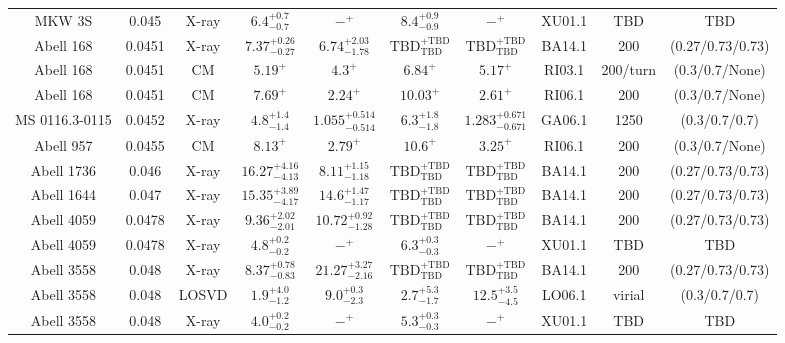 \begin{table}
\begin{tabular}{cccccccccc}
MKW 3S & 0.045 & X-ray & ${6.4}^{+0.7}_{-0.7}$ & ${-}^{+}_{}$ & ${8.4}^{+0.9}_{-0.9}$ & ${-}^{+}_{}$ & XU01.1 & TBD & TBD \\
Abell 168 & 0.0451 & X-ray & ${7.37}^{+0.26}_{-0.27}$ & ${6.74}^{+2.03}_{-1.78}$ & ${\mathrm{TBD}}^{+\mathrm{TBD}}_{\mathrm{TBD}}$ & ${\mathrm{TBD}}^{+\mathrm{TBD}}_{\mathrm{TBD}}$ & BA14.1 & 200 & (0.27/0.73/0.73) \\
Abell 168 & 0.0451 & CM & ${5.19}^{+}_{}$ & ${4.3}^{+}_{}$ & ${6.84}^{+}_{}$ & ${5.17}^{+}_{}$ & RI03.1 & 200/turn & (0.3/0.7/None) \\
Abell 168 & 0.0451 & CM & ${7.69}^{+}_{}$ & ${2.24}^{+}_{}$ & ${10.03}^{+}_{}$ & ${2.61}^{+}_{}$ & RI06.1 & 200 & (0.3/0.7/None) \\
MS 0116.3-0115 & 0.0452 & X-ray & ${4.8}^{+1.4}_{-1.4}$ & ${1.055}^{+0.514}_{-0.514}$ & ${6.3}^{+1.8}_{-1.8}$ & ${1.283}^{+0.671}_{-0.671}$ & GA06.1 & 1250 & (0.3/0.7/0.7) \\
Abell 957 & 0.0455 & CM & ${8.13}^{+}_{}$ & ${2.79}^{+}_{}$ & ${10.6}^{+}_{}$ & ${3.25}^{+}_{}$ & RI06.1 & 200 & (0.3/0.7/None) \\
Abell 1736 & 0.046 & X-ray & ${16.27}^{+4.16}_{-4.13}$ & ${8.11}^{+1.15}_{-1.18}$ & ${\mathrm{TBD}}^{+\mathrm{TBD}}_{\mathrm{TBD}}$ & ${\mathrm{TBD}}^{+\mathrm{TBD}}_{\mathrm{TBD}}$ & BA14.1 & 200 & (0.27/0.73/0.73) \\
Abell 1644 & 0.047 & X-ray & ${15.35}^{+3.89}_{-4.17}$ & ${14.6}^{+1.47}_{-1.17}$ & ${\mathrm{TBD}}^{+\mathrm{TBD}}_{\mathrm{TBD}}$ & ${\mathrm{TBD}}^{+\mathrm{TBD}}_{\mathrm{TBD}}$ & BA14.1 & 200 & (0.27/0.73/0.73) \\
Abell 4059 & 0.0478 & X-ray & ${9.36}^{+2.02}_{-2.01}$ & ${10.72}^{+0.92}_{-1.28}$ & ${\mathrm{TBD}}^{+\mathrm{TBD}}_{\mathrm{TBD}}$ & ${\mathrm{TBD}}^{+\mathrm{TBD}}_{\mathrm{TBD}}$ & BA14.1 & 200 & (0.27/0.73/0.73) \\
Abell 4059 & 0.0478 & X-ray & ${4.8}^{+0.2}_{-0.2}$ & ${-}^{+}_{}$ & ${6.3}^{+0.3}_{-0.3}$ & ${-}^{+}_{}$ & XU01.1 & TBD & TBD \\
Abell 3558 & 0.048 & X-ray & ${8.37}^{+0.78}_{-0.83}$ & ${21.27}^{+3.27}_{-2.16}$ & ${\mathrm{TBD}}^{+\mathrm{TBD}}_{\mathrm{TBD}}$ & ${\mathrm{TBD}}^{+\mathrm{TBD}}_{\mathrm{TBD}}$ & BA14.1 & 200 & (0.27/0.73/0.73) \\
Abell 3558 & 0.048 & LOSVD & ${1.9}^{+4.0}_{-1.2}$ & ${9.0}^{+0.3}_{-2.3}$ & ${2.7}^{+5.3}_{-1.7}$ & ${12.5}^{+3.5}_{-4.5}$ & LO06.1 & virial & (0.3/0.7/0.7) \\
Abell 3558 & 0.048 & X-ray & ${4.0}^{+0.2}_{-0.2}$ & ${-}^{+}_{}$ & ${5.3}^{+0.3}_{-0.3}$ & ${-}^{+}_{}$ & XU01.1 & TBD & TBD \\

\end{tabular}
\end{table}
